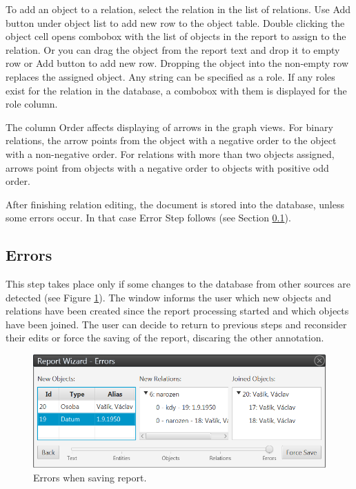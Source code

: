 To add an object to a relation, select the relation in the list of relations.
Use Add button under object list to add new row to the object table. Double
clicking the object cell opens combobox with the list of objects in the report
to assign to the relation. Or you can drag the object from the report text and
drop it to empty row or Add button to add new row. Dropping the object into the
non-empty row replaces the assigned object. Any string can be specified as
a role. If any roles exist for the relation in the database, a combobox with
them is displayed for the role column.

The column Order affects displaying of arrows in the graph views. For binary
relations, the arrow points from the object with a negative order to the object with
a non-negative order. For relations with more than two objects assigned, arrows
point from objects with a negative order to objects with positive odd order.

After finishing relation editing, the document is stored into the database,
unless some errors occur. In that case Error Step follows (see Section
\ref{sssec:Errors}).

\subsection{Errors }
\label{sssec:Errors}

This step takes place only if some changes to the database from other sources
are detected (see Figure \ref{fig:Errors}). The window informs the user which
new objects and relations have been created since the report processing started
and which objects have been joined. The user can decide to return to previous
steps and reconsider their edits or force the saving of the report, discaring the
other annotation.

\begin{figure}[!htb]
        \centering
        \includegraphics[width=\textwidth]{Images/errors}
        \caption{Errors when saving report.}
        \label{fig:Errors}
\end{figure}

